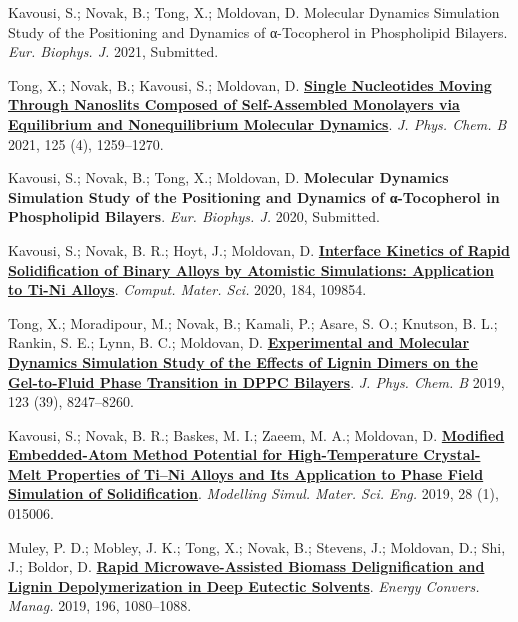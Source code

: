 \pagebreak


\begin{cventries}
  \cventry
    {} %
    {} %
    {} %
    {} %
    {
      \begin{cvitems} %
        \item{Kavousi, S.; Novak, B.; Tong, X.; Moldovan, D. Molecular Dynamics Simulation Study of the Positioning and Dynamics of α-Tocopherol in Phospholipid Bilayers. \textit{Eur. Biophys. J.} 2021, Submitted.}
        \item {Tong, X.; Novak, B.; Kavousi, S.; Moldovan, D. \href{https://doi.org/10.1021/acs.jpcb.0c07797}{\textbf{Single Nucleotides Moving Through Nanoslits Composed of Self-Assembled Monolayers via Equilibrium and Nonequilibrium Molecular Dynamics}}. \textit{J. Phys. Chem. B} 2021, 125 (4), 1259–1270.}
        \item {Kavousi, S.; Novak, B.; Tong, X.; Moldovan, D. \textbf{Molecular Dynamics Simulation Study of the Positioning and Dynamics of α-Tocopherol in Phospholipid Bilayers}. \textit{Eur. Biophys. J.} 2020, Submitted.}
        \item {Kavousi, S.; Novak, B. R.; Hoyt, J.; Moldovan, D. \href{https://doi.org/10.1016/j.commatsci.2020.109854.}{\textbf{Interface Kinetics of Rapid Solidification of Binary Alloys by Atomistic Simulations: Application to Ti-Ni Alloys}}. \textit{Comput. Mater. Sci.} 2020, 184, 109854.}
        \item {Tong, X.; Moradipour, M.; Novak, B.; Kamali, P.; Asare, S. O.; Knutson, B. L.; Rankin, S. E.; Lynn, B. C.; Moldovan, D. \href{https://doi.org/10.1021/acs.jpcb.9b05525}{\textbf{Experimental and Molecular Dynamics Simulation Study of the Effects of Lignin Dimers on the Gel-to-Fluid Phase Transition in DPPC Bilayers}}. \textit{J. Phys. Chem. B} 2019, 123 (39), 8247–8260.}
        \item {Kavousi, S.; Novak, B. R.; Baskes, M. I.; Zaeem, M. A.; Moldovan, D. \href{https://doi.org/10.1088/1361-651X/ab580c}{\textbf{Modified Embedded-Atom Method Potential for High-Temperature Crystal-Melt Properties of Ti–Ni Alloys and Its Application to Phase Field Simulation of Solidification}}. \textit{Modelling Simul. Mater. Sci. Eng.} 2019, 28 (1), 015006.}
        \item {Muley, P. D.; Mobley, J. K.; Tong, X.; Novak, B.; Stevens, J.; Moldovan, D.; Shi, J.; Boldor, D. \href{https://doi.org/10.1016/j.enconman.2019.06.070}{\textbf{Rapid Microwave-Assisted Biomass Delignification and Lignin Depolymerization in Deep Eutectic Solvents}}. \textit{Energy Convers. Manag.} 2019, 196, 1080–1088.}

\end{cvitems}}
\end{cventries}
